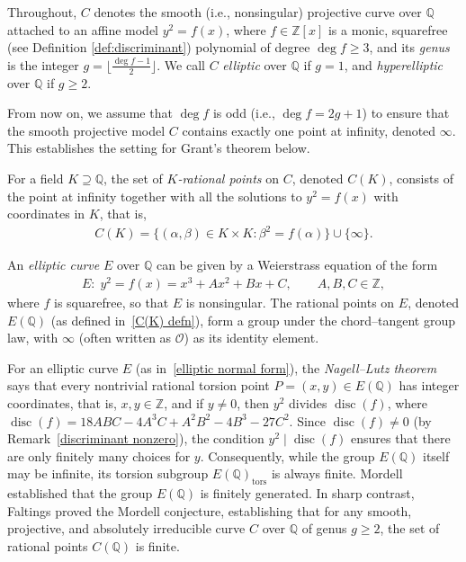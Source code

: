 \documentclass[11pt,a4paper]{amsart}
\newcommand{\ZZ}{\mathbb{Z}}
\newcommand{\Q}{\mathbb{Q}}
\theoremstyle{plain}
\theoremstyle{definition}
\DeclareMathOperator{\disc}{disc}
\begin{document}
Throughout, $C$ denotes the smooth (i.e., nonsingular) projective curve over $\Q$ attached to an affine model $y^2=f(x)$, where $f\in\ZZ[x]$ is a monic, squarefree (see Definition \ref{def:discriminant}) polynomial of degree $\deg f\ge 3$, and its \textit{genus} is the integer $g=\lfloor \frac{\deg f-1}{2}\rfloor$. We call $C$ \textit{elliptic} over $\Q$ if $g=1$, and \textit{hyperelliptic} over $\Q$ if $g\ge 2$.



From now on, we assume that $\deg f$ is odd (i.e., $\deg f =2g+1$) to ensure that the smooth projective model $C$ contains exactly one point at infinity, denoted $\infty$. This establishes the setting for Grant's theorem below.

For a field $K \supseteq \Q$, the set of
\textit{$K$-rational points} on $C$, denoted $C(K)$, consists of the point at infinity together with all the solutions to $y^2=f(x)$ with coordinates in $K$, that is,
\begin{align}\label{C(K) defn}
   C(K)=\bigl\{(\alpha,\beta)\in K\times K : \beta^2=f(\alpha)\bigr\}\cup\{\infty\}.
\end{align}


An \textit{elliptic curve} $E$ over $\Q$ can be given by a Weierstrass equation of the form
\begin{align}\label{elliptic normal form}
    E\colon\; y^2=f(x)=x^3+Ax^2+Bx+C,\qquad A,B,C\in\ZZ,    
\end{align}
where $f$ is squarefree, so that $E$ is nonsingular. The rational points on $E$, denoted $E(\Q)$ (as defined in~\eqref{C(K) defn}), form a group under the chord–tangent group law, with $\infty$ (often written as $\mathcal{O}$) as its identity element.



For an elliptic curve $E$ (as in~\eqref{elliptic normal form}), the \textit{Nagell--Lutz theorem} says that every nontrivial rational torsion point $P=(x,y) \in E(\Q)$ has integer coordinates, that is, $x,y\in\ZZ$, and if $y\ne0$, then $y^2$ divides $\disc(f)$, where
$\disc(f)=18ABC-4A^3C+A^2B^2-4B^3-27C^2$. Since $\disc(f)\neq 0$ (by Remark~\ref{discriminant nonzero}), the condition $y^2 \mid \disc(f)$ ensures that there are only finitely many choices for $y$. Consequently, while the group $E(\Q)$ itself may be infinite, its torsion subgroup $E(\Q)_{\mathrm{tors}}$ is always finite. Mordell
\cite{Mordell1922} established that the group $E(\Q)$ is finitely generated. In sharp contrast, Faltings \cite{Faltings1983} proved the Mordell conjecture, establishing that for any smooth, projective, and absolutely irreducible curve $C$ over $\Q$ of genus $g \ge 2$, the set of rational points $C(\Q)$ is finite.
\end{document}
